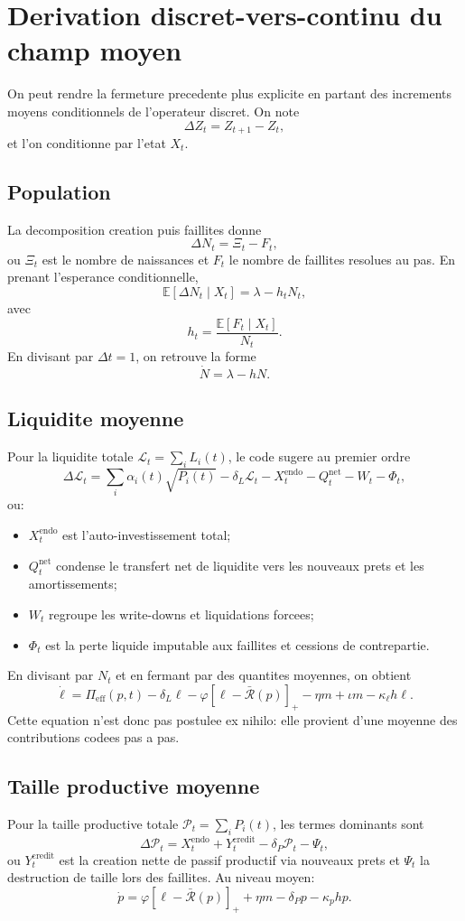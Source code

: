 \documentclass[11pt,a4paper]{article}
\begin{document}
\appendix

\section{Derivation discret-vers-continu du champ moyen}
On peut rendre la fermeture precedente plus explicite en partant des increments moyens conditionnels de l'operateur discret. On note
\[
\Delta Z_t = Z_{t+1}-Z_t,
\]
et l'on conditionne par l'etat $X_t$.

\subsection{Population}
La decomposition creation puis faillites donne
\[
\Delta N_t = \Xi_t - F_t,
\]
ou $\Xi_t$ est le nombre de naissances et $F_t$ le nombre de faillites resolues au pas. En prenant l'esperance conditionnelle,
\[
\mathbb E[\Delta N_t\mid X_t] = \lambda - h_t N_t,
\]
avec
\[
h_t = \frac{\mathbb E[F_t\mid X_t]}{N_t}.
\]
En divisant par $\Delta t=1$, on retrouve la forme
\[
\dot N = \lambda - hN.
\]

\subsection{Liquidite moyenne}
Pour la liquidite totale $\mathcal L_t=\sum_i L_i(t)$, le code sugere au premier ordre
\[
\Delta \mathcal L_t
=
\sum_i \alpha_i(t)\sqrt{P_i(t)}
-\delta_L \mathcal L_t
-X_t^{\mathrm{endo}}
-Q_t^{\mathrm{net}}
-W_t
-\Phi_t,
\]
ou:
\begin{itemize}
\item $X_t^{\mathrm{endo}}$ est l'auto-investissement total;
\item $Q_t^{\mathrm{net}}$ condense le transfert net de liquidite vers les nouveaux prets et les amortissements;
\item $W_t$ regroupe les write-downs et liquidations forcees;
\item $\Phi_t$ est la perte liquide imputable aux faillites et cessions de contrepartie.
\end{itemize}
En divisant par $N_t$ et en fermant par des quantites moyennes, on obtient
\[
\dot \ell
=
\Pi_{\mathrm{eff}}(p,t)
-\delta_L\ell
-\varphi[\ell-\bar{\mathcal R}(p)]_+
-\eta m
+\iota m
-\kappa_\ell h\ell.
\]
Cette equation n'est donc pas postulee ex nihilo: elle provient d'une moyenne des contributions codees pas a pas.

\subsection{Taille productive moyenne}
Pour la taille productive totale $\mathcal P_t=\sum_i P_i(t)$, les termes dominants sont
\[
\Delta \mathcal P_t
=
X_t^{\mathrm{endo}}
+Y_t^{\mathrm{credit}}
-\delta_P \mathcal P_t
-\Psi_t,
\]
ou $Y_t^{\mathrm{credit}}$ est la creation nette de passif productif via nouveaux prets et $\Psi_t$ la destruction de taille lors des faillites. Au niveau moyen:
\[
\dot p
=
\varphi[\ell-\bar{\mathcal R}(p)]_+
+\eta m
-\delta_P p
-\kappa_p hp.
\]
\end{document}
